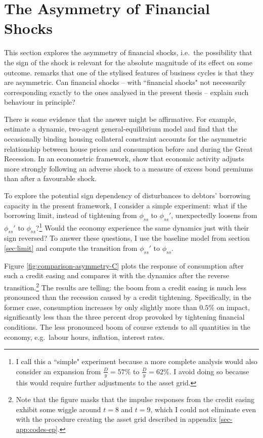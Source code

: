 \documentclass[a4paper,12pt]{article} %
\numberwithin{equation}{section} %
\numberwithin{figure}{section}
\numberwithin{table}{section}
\begin{document}
\section{The Asymmetry of Financial Shocks}
\label{sec:asymmetry}

This section explores the asymmetry of financial shocks, i.e.~the possibility that the sign of the
shock is relevant for the absolute magnitude of its effect on some outcome. \textcite{kocherlakota2000} remarks that one of the stylised features of business cycles is that they are asymmetric. Can financial shocks -- with ``financial shocks" not necessarily corresponding exactly to the ones analysed in the present thesis -- explain such behaviour in principle? 

There is some evidence that the answer might be affirmative. For example, \textcite{guerrieri2017asym} estimate a dynamic, two-agent general-equilibrium model and find that the occasionally binding housing collateral constraint accounts for the asymmetric relationship between house prices and consumption before and during the Great Recession. In an econometric framework, \textcite{barnichon2022} show that economic activity adjusts more strongly following an adverse shock to a measure of excess bond premiums than after a favourable shock. %

To explore the potential sign dependency of disturbances to debtors' borrowing capacity in the present framework, I consider a simple experiment: what if the borrowing limit, instead of tightening from $\phi_{ss}$ to $\phi_{ss}'$, unexpectedly loosens from $\phi_{ss}'$ to $\phi_{ss}$?\footnote{I call this a ``simple" experiment because a more complete analysis would also consider an expansion from $\frac{D}{y} = 57\%$ to $\frac{D}{y} = 62\%$. I avoid doing so because this would require further adjustments to the asset grid.} Would the economy experience the same dynamics just with their sign reversed? To answer these questions, I use the baseline model from section \ref{sec:limit} and compute the transition from $\phi_{ss}'$ to $\phi_{ss}$. %

Figure \ref{fig:comparison-asymmetry-C} plots the response of consumption after such a credit easing and compares it with the dynamics after the reverse transition.\footnote{Note that the figure masks that the impulse responses from the credit easing exhibit some wiggle around $t=8$ and $t=9$, which I could not eliminate even with the procedure creating the asset grid described in appendix \ref{sec-app:codes-ep}.} The results are telling: the boom from a credit easing is much less pronounced than the recession caused by a credit tightening. Specifically, in the former case, consumption increases by only slightly more than $0.5\%$ on impact, significantly less than the three percent drop provoked by tightening financial conditions. The less pronounced boom of course extends to all quantities in the economy, e.g.~labour hours, inflation, interest rates.
\end{document}
